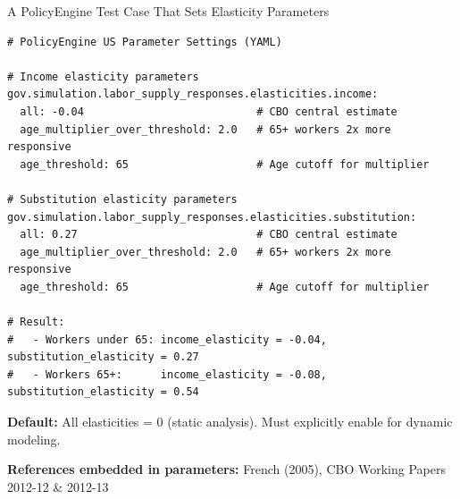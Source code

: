 \documentclass[11pt,aspectratio=169]{beamer}
\begin{document}
\begin{frame}[fragile]{A PolicyEngine Test Case That Sets Elasticity Parameters}
\vspace{0.2cm}
\tiny
\begin{verbatim}
# PolicyEngine US Parameter Settings (YAML)

# Income elasticity parameters
gov.simulation.labor_supply_responses.elasticities.income:
  all: -0.04                           # CBO central estimate
  age_multiplier_over_threshold: 2.0   # 65+ workers 2x more responsive
  age_threshold: 65                    # Age cutoff for multiplier

# Substitution elasticity parameters
gov.simulation.labor_supply_responses.elasticities.substitution:
  all: 0.27                            # CBO central estimate
  age_multiplier_over_threshold: 2.0   # 65+ workers 2x more responsive
  age_threshold: 65                    # Age cutoff for multiplier

# Result:
#   - Workers under 65: income_elasticity = -0.04,  substitution_elasticity = 0.27
#   - Workers 65+:      income_elasticity = -0.08,  substitution_elasticity = 0.54
\end{verbatim}

\vspace{0.1cm}
\scriptsize
\textbf{Default:} All elasticities = 0 (static analysis). Must explicitly enable for dynamic modeling.

\vspace{0.1cm}
\textbf{References embedded in parameters:} French (2005), CBO Working Papers 2012-12 \& 2012-13
\end{frame}
\end{document}
